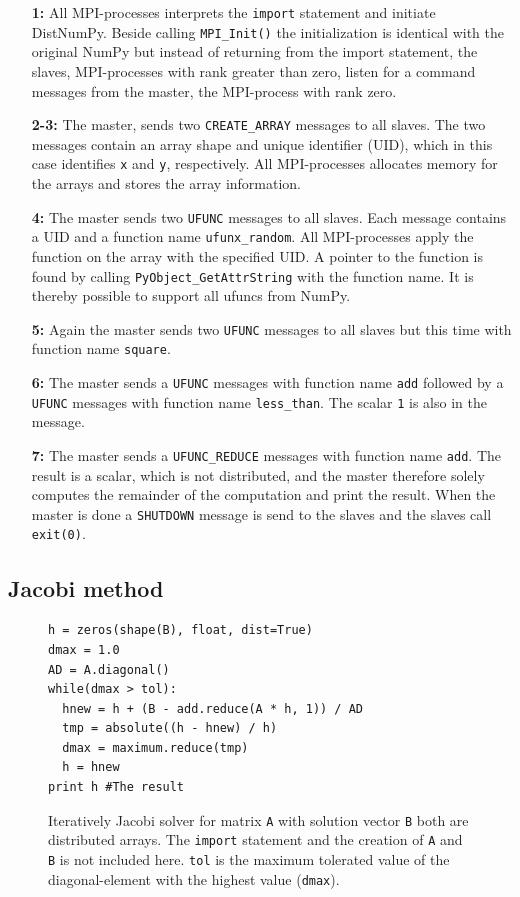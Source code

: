 \documentclass[10pt]{article}
\begin{document}
\begin{enumerate}
\item[\textbf{1:}] All MPI-processes interprets the \texttt{import} statement and initiate DistNumPy. Beside calling \texttt{MPI\_Init()} the initialization is identical with the original NumPy but instead of returning from the import statement, the slaves, MPI-processes with rank greater than zero, listen for a command messages from the master, the MPI-process with rank zero.
\item[\textbf{2-3:}] The master, sends two \texttt{CREATE\_ARRAY} messages to all slaves. The two messages contain an array shape and unique identifier (UID), which in this case identifies \texttt{x} and \texttt{y}, respectively. All MPI-processes allocates memory for the arrays and stores the array information.
\item[\textbf{4:}] The master sends two \texttt{UFUNC} messages to all slaves. Each message contains a UID and a function name \texttt{ufunx\_random}. All MPI-processes apply the function on the array with the specified UID. A pointer to the function is found by calling \texttt{PyObject\_GetAttrString} with the function name. It is thereby possible to support all ufuncs from NumPy.
\item[\textbf{5:}] Again the master sends two \texttt{UFUNC} messages to all slaves but this time with function name \texttt{square}.
\item[\textbf{6:}] The master sends a \texttt{UFUNC} messages with function name \texttt{add} followed by a \texttt{UFUNC} messages with function name \texttt{less\_than}. The scalar \texttt{1} is also in the message.
\item[\textbf{7:}] The master sends a \texttt{UFUNC\_REDUCE} messages with function name \texttt{add}. The result is a scalar, which is not distributed, and the master therefore solely computes the remainder of the computation and print the result. When the master is done a \texttt{SHUTDOWN} message is send to the slaves and the slaves call \texttt{exit(0)}.
\end{enumerate}


\subsection{Jacobi method}
\begin{figure}
\begin{lstlisting}
h = zeros(shape(B), float, dist=True)
dmax = 1.0
AD = A.diagonal()
while(dmax > tol):
  hnew = h + (B - add.reduce(A * h, 1)) / AD
  tmp = absolute((h - hnew) / h)
  dmax = maximum.reduce(tmp)
  h = hnew
print h #The result
\end{lstlisting}
 \caption{Iteratively Jacobi solver for matrix \texttt{A} with solution vector \texttt{B} both are distributed arrays. The \texttt{import} statement and the creation of \texttt{A} and \texttt{B} is not included here.
 \texttt{tol} is the maximum tolerated value of the diagonal-element with the highest value (\texttt{dmax}).}
 \label{lst:jocobi}
\end{figure}
\end{document}

